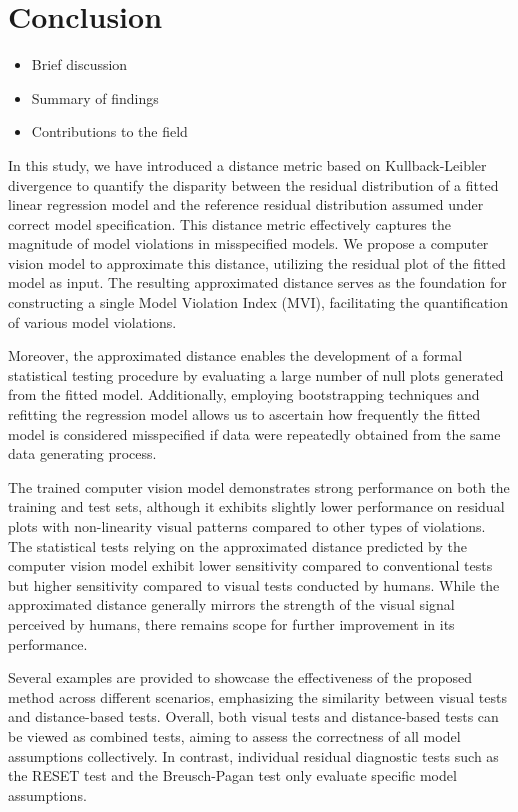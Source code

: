 \documentclass[]{interact}
\theoremstyle{plain}%
\theoremstyle{definition}
\theoremstyle{remark}
\providecommand{\tightlist}{%
  \setlength{\itemsep}{0pt}\setlength{\parskip}{0pt}}
\def\tightlist{}
\begin{document}
\hypertarget{conclusion}{%
\section{Conclusion}\label{conclusion}}

\begin{itemize}
\tightlist
\item
  Brief discussion
\item
  Summary of findings
\item
  Contributions to the field
\end{itemize}

In this study, we have introduced a distance metric based on
Kullback-Leibler divergence to quantify the disparity between the
residual distribution of a fitted linear regression model and the
reference residual distribution assumed under correct model
specification. This distance metric effectively captures the magnitude
of model violations in misspecified models. We propose a computer vision
model to approximate this distance, utilizing the residual plot of the
fitted model as input. The resulting approximated distance serves as the
foundation for constructing a single Model Violation Index (MVI),
facilitating the quantification of various model violations.

Moreover, the approximated distance enables the development of a formal
statistical testing procedure by evaluating a large number of null plots
generated from the fitted model. Additionally, employing bootstrapping
techniques and refitting the regression model allows us to ascertain how
frequently the fitted model is considered misspecified if data were
repeatedly obtained from the same data generating process.

The trained computer vision model demonstrates strong performance on
both the training and test sets, although it exhibits slightly lower
performance on residual plots with non-linearity visual patterns
compared to other types of violations. The statistical tests relying on
the approximated distance predicted by the computer vision model exhibit
lower sensitivity compared to conventional tests but higher sensitivity
compared to visual tests conducted by humans. While the approximated
distance generally mirrors the strength of the visual signal perceived
by humans, there remains scope for further improvement in its
performance.

Several examples are provided to showcase the effectiveness of the
proposed method across different scenarios, emphasizing the similarity
between visual tests and distance-based tests. Overall, both visual
tests and distance-based tests can be viewed as combined tests, aiming
to assess the correctness of all model assumptions collectively. In
contrast, individual residual diagnostic tests such as the RESET test
and the Breusch-Pagan test only evaluate specific model assumptions.
\end{document}
